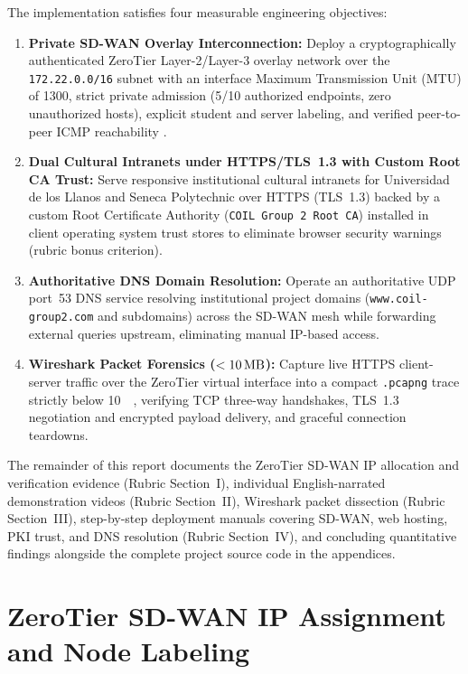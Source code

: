 The implementation satisfies four measurable engineering objectives:
\begin{enumerate}
    \item \textbf{Private SD-WAN Overlay Interconnection:} Deploy a cryptographically authenticated ZeroTier Layer-2/Layer-3 overlay network over the \texttt{172.22.0.0/16} subnet with an interface Maximum Transmission Unit (MTU) of \qty{1300}{\byte}, strict private admission (\num{5}/\num{10} authorized endpoints, zero unauthorized hosts), explicit student and server labeling, and verified peer-to-peer ICMP reachability \cite{zerotier2024}.
    \item \textbf{Dual Cultural Intranets under HTTPS/TLS~1.3 with Custom Root CA Trust:} Serve responsive institutional cultural intranets for Universidad de los Llanos and Seneca Polytechnic over HTTPS (TLS~1.3) backed by a custom Root Certificate Authority (\texttt{COIL Group 2 Root CA}) installed in client operating system trust stores to eliminate browser security warnings (rubric bonus criterion).
    \item \textbf{Authoritative DNS Domain Resolution:} Operate an authoritative UDP port~53 DNS service resolving institutional project domains (\texttt{www.coil-group2.com} and subdomains) across the SD-WAN mesh while forwarding external queries upstream, eliminating manual IP-based access.
    \item \textbf{Wireshark Packet Forensics ($< \qty{10}{\mega\byte}$):} Capture live HTTPS client-server traffic over the ZeroTier virtual interface into a compact \texttt{.pcapng} trace strictly below \qty{10}{\mega\byte}, verifying TCP three-way handshakes, TLS~1.3 negotiation and encrypted payload delivery, and graceful connection teardowns.
\end{enumerate}

The remainder of this report documents the ZeroTier SD-WAN IP allocation and verification evidence (Rubric Section~I), individual English-narrated demonstration videos (Rubric Section~II), Wireshark packet dissection (Rubric Section~III), step-by-step deployment manuals covering SD-WAN, web hosting, PKI trust, and DNS resolution (Rubric Section~IV), and concluding quantitative findings alongside the complete project source code in the appendices.

\section{ZeroTier SD-WAN IP Assignment and Node Labeling}
\label{sec:zerotier_sdwan}

